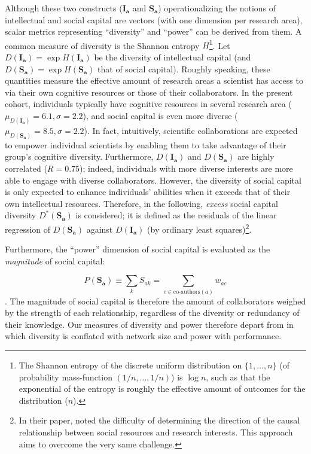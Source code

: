 \documentclass{article}
\begin{document}
Although these two constructs ($\bm{I_a}$ and $\bm{S_a}$) operationalizing the notions of intellectual and social capital are vectors (with one dimension per research area), scalar metrics representing ``diversity'' and ``power'' can be derived from them. A common measure of diversity is the Shannon entropy $H$\footnote{The Shannon entropy of the discrete uniform distribution on $\{1,\dots,n\}$ (of probability mass-function $(1/n,\dots,1/n)$) is $\log{n}$, such as that the exponential of the entropy is roughly the effective amount of outcomes for the distribution ($n$).}. Let 
 $D(\bm{I_a})=\exp{H(\bm{I_a})}$ be the diversity of intellectual capital (and $D(\bm{S_a})=\exp{H(\bm{S_a})}$ that of social capital). Roughly speaking, these quantities measure the effective amount of research areas a scientist has access to via their own cognitive resources or those of their collaborators. In the present cohort,  individuals typically have cognitive resources in several research area ($\mu_{D(\bm{I_a})}=6.1,\sigma=2.2$), and social capital is even more diverse ($\mu_{D(\bm{S_a})}=8.5,\sigma=2.2$). In fact, intuitively,  scientific collaborations are expected to empower individual scientists by enabling them to take advantage of their group's cognitive diversity. Furthermore, $D(\bm{I_a})$ and $D(\bm{S_a})$ are highly correlated ($R=0.75$); indeed, individuals with more diverse interests are more able to engage with diverse collaborators. However, the diversity of social capital is only expected to enhance individuals' abilities when it exceeds that of their own intellectual resources. Therefore, in the following, \textit{excess} social capital diversity $D^{\ast}(\bm{S_a})$ is considered; it is defined as the residuals of the linear regression of $D(\bm{S_a})$ against $D(\bm{I_a})$ (by ordinary least squares)\footnote{In their paper, \citet{Tripodi2020} noted the difficulty of determining the direction of the causal relationship between social resources and research interests. This approach aims to overcome the very same challenge.}.

Furthermore, the ``power'' dimension of social capital is evaluated as the \textit{magnitude} of social capital:

\begin{equation}
    P(\bm{S_a})\equiv \sum_k S_{ak} = \sum_{c \in \text{co-authors}(a)} w_{ac}
\end{equation}. The magnitude of social capital is therefore the amount of collaborators weighed by the strength of each relationship, regardless of the diversity or redundancy of their knowledge. Our measures of diversity and power therefore depart from \citealt{Abbasi2014} in which diversity is conflated with network size and power with performance. %
\end{document}
